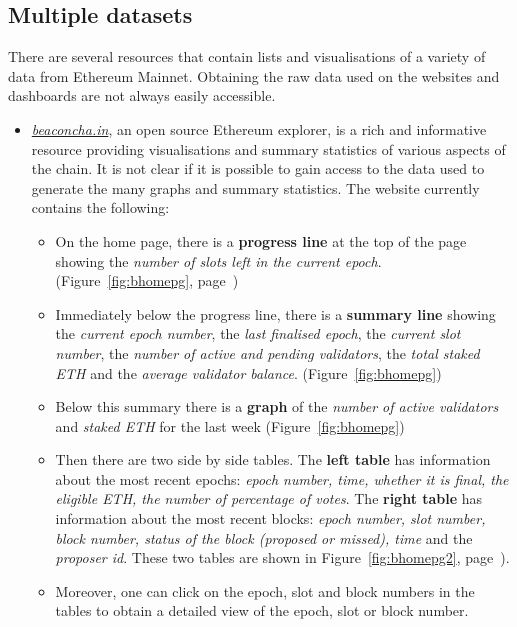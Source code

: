 \documentclass[UTF8]{article}
\begin{document}
\subsection{Multiple datasets}
There are several resources that contain lists and visualisations of a variety of data from Ethereum Mainnet. Obtaining the raw data used on the websites and dashboards are not always easily accessible.
\label{sec:multiple}
\begin{itemize}
	\item \textit{\href{https://beaconcha.in/}{beaconcha.in}}, an open source Ethereum explorer, is a rich and informative resource providing visualisations and summary statistics of various aspects of the chain. It is not clear if it is possible to gain access to the data used to generate the many graphs and summary statistics. The website currently contains the following:
	\begin{itemize}
		\item On the home page, there is a \textbf{progress line} at the top of the page showing the \textit{number of slots left in the current epoch}. (Figure~\ref{fig:bhomepg}, page~\pageref{fig:bhomepg})
		\item Immediately below the progress line, there is a \textbf{summary line} showing the \textit{current epoch number}, the \textit{last finalised epoch}, the \textit{current slot number}, the \textit{number of active and pending validators}, the \textit{total staked ETH} and the \textit{average validator balance}. (Figure~\ref{fig:bhomepg})
		\item Below this summary there is a \textbf{graph} of the \textit{number of active validators} and \textit{staked ETH} for the last week (Figure~\ref{fig:bhomepg})
		\item Then there are two side by side tables. The \textbf{left table} has information about the most recent epochs: \textit{epoch number, time, whether it is final, the eligible ETH, the number of percentage of votes}. The \textbf{right table} has information about the most recent blocks: \textit{epoch number, slot number, block number, status of the block (proposed or missed), time} and the \textit{proposer id}. These two tables are shown in Figure~\ref{fig:bhomepg2}, page~\pageref{fig:bhomepg2}).\\
		\item Moreover, one can click on the epoch, slot and block numbers in the tables to obtain a detailed view of the epoch, slot or block number. 

\end{itemize}
\end{itemize}
\end{document}
